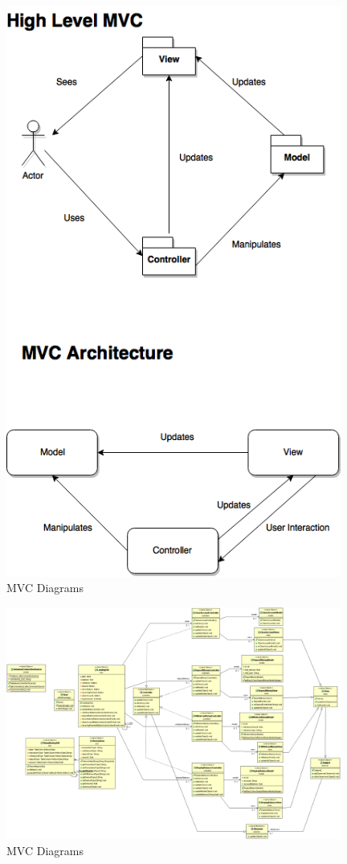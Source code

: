 \documentclass[12pt]{article}
\begin{document}
\begin{figure}[h!]
  \centering
  \includegraphics[width=110mm]{MVC.png}
  \caption{MVC Diagrams}
\end{figure}

\begin{figure}[h!]
  \centering
  \includegraphics[width=110mm]{class_diagram.png}
  \caption{MVC Diagrams}
\end{figure}
\end{document}
